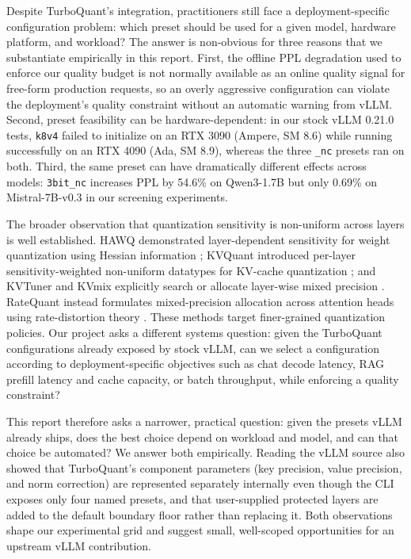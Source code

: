 \documentclass[10pt]{article}
\begin{document}
Despite TurboQuant's integration, practitioners still face a deployment-specific configuration problem: which preset should be used for a given model, hardware platform, and workload? The answer is non-obvious for three reasons that we substantiate empirically in this report. First, the offline PPL degradation used to enforce our quality budget is not normally available as an online quality signal for free-form production requests, so an overly aggressive configuration can violate the deployment's quality constraint without an automatic warning from vLLM. Second, preset feasibility can be hardware-dependent: in our stock vLLM 0.21.0 tests, \texttt{k8v4} failed to initialize on an RTX 3090 (Ampere, SM 8.6) while running successfully on an RTX 4090 (Ada, SM 8.9), whereas the three \texttt{\_nc} presets ran on both. Third, the same preset can have dramatically different effects across models: \texttt{3bit\_nc} increases PPL by 54.6\% on Qwen3-1.7B but only 0.69\% on Mistral-7B-v0.3 in our screening experiments.

The broader observation that quantization sensitivity is non-uniform across layers is well established. HAWQ demonstrated layer-dependent sensitivity for weight quantization using Hessian information \cite{hawq}; KVQuant introduced per-layer sensitivity-weighted non-uniform datatypes for KV-cache quantization \cite{kvquant}; and KVTuner and KVmix explicitly search or allocate layer-wise mixed precision \cite{kvtuner,kvmix}. RateQuant instead formulates mixed-precision allocation across attention heads using rate-distortion theory \cite{ratequant}. These methods target finer-grained quantization policies. Our project asks a different systems question: given the TurboQuant configurations already exposed by stock vLLM, can we select a configuration according to deployment-specific objectives such as chat decode latency, RAG prefill latency and cache capacity, or batch throughput, while enforcing a quality constraint?

This report therefore asks a narrower, practical question: given the presets vLLM already ships, does the best choice depend on workload and model, and can that choice be automated? We answer both empirically. Reading the vLLM source also showed that TurboQuant's component parameters (key precision, value precision, and norm correction) are represented separately internally even though the CLI exposes only four named presets, and that user-supplied protected layers are added to the default boundary floor rather than replacing it. Both observations shape our experimental grid and suggest small, well-scoped opportunities for an upstream vLLM contribution.
\end{document}
